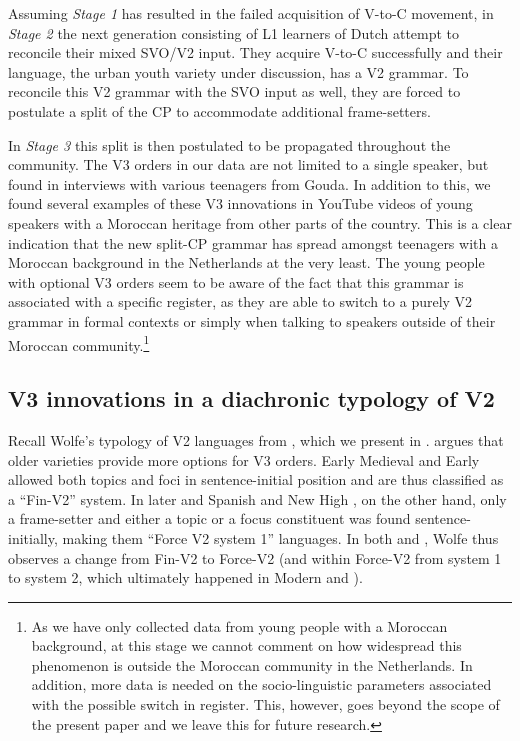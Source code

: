\documentclass[output=paper]{langsci/langscibook}
\begin{document}
Assuming \textit{Stage 1} has resulted in the failed acquisition of V-to-C
movement, in \textit{Stage 2} the next generation consisting of L1 learners of
Dutch attempt to reconcile their mixed SVO/V2 input. They acquire V-to-C
successfully and their language, the urban youth variety under discussion, has
a V2 grammar. To reconcile this V2 grammar with the SVO input as well, they are
forced to postulate a split of the CP to accommodate additional frame-setters.

In \textit{Stage 3} this split is then postulated to be propagated throughout
the community. The V3 orders in our data are not limited to a
single speaker, but found in interviews with various teenagers from Gouda. In
addition to this, we found several examples of these V3
innovations in YouTube videos of young speakers with a Moroccan heritage from
other parts of the country. This is a clear indication that the new split-CP
grammar has spread amongst teenagers with a Moroccan background in the
Netherlands at the very least. The young people with optional V3 orders seem to be aware of the fact that this grammar is associated with
a specific register, as they are able to switch to a purely V2 grammar in
formal contexts or simply when talking to  speakers outside of their
Moroccan  community.\footnote{As we have only collected data from
    young people with a Moroccan background, at this stage we cannot comment on
    how widespread this phenomenon is outside the Moroccan community in the
Netherlands. In addition, more data is needed on the socio-linguistic
parameters associated with the possible switch in register. This, however, goes
beyond the scope of the present paper and we leave this for future research.}

\subsection{V3 innovations in a diachronic typology of V2}

Recall Wolfe's typology of V2 languages from , which we present in
. \citet{Wolfe:2017} argues that older  varieties provide more
options for V3 orders. Early Medieval  and Early  allowed
both topics and foci in sentence-initial position and are thus classified as a
\enquote{Fin-V2} system. In later  and Spanish and New High ,
on the other hand, only a frame-setter and either a topic or a focus
constituent was found sentence-initially, making them \enquote{Force V2 system 1}
languages.  In both  and , Wolfe thus observes a change from
Fin-V2 to Force-V2 (and within Force-V2 from system 1 to system 2, which
ultimately happened in Modern  and ).\largerpage[-2]
\end{document}
